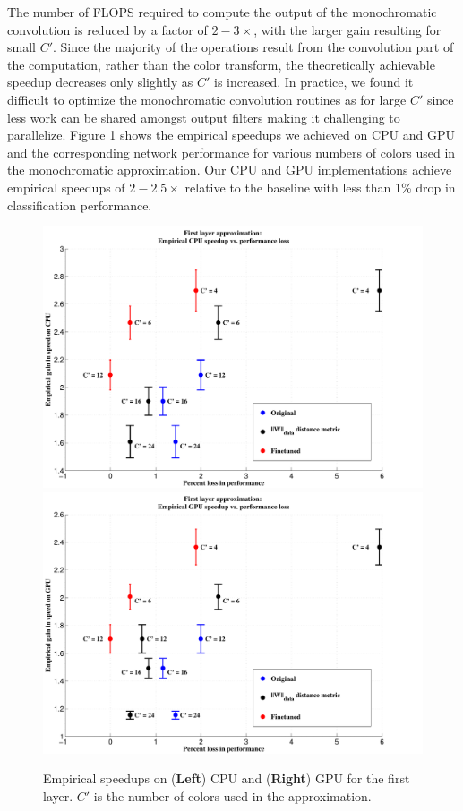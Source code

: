 The number of FLOPS required to compute the output of the monochromatic convolution is reduced by a factor of $2-3\times$, with the larger gain resulting for small $C'$. 
Since the majority of the operations result from the convolution part of the computation, rather than the color transform,
the theoretically achievable speedup decreases only slightly as $C'$ is increased.
In practice, we found it difficult to optimize the monochromatic convolution routines as for large $C'$ since less work can be shared amongst output filters making it challenging to parallelize.
Figure \ref{fig:mono_speedups} shows the empirical speedups we achieved on CPU and GPU and the corresponding network performance for various numbers of colors used in the monochromatic approximation.   
Our CPU and GPU implementations achieve empirical speedups of $2-2.5\times$ relative to the baseline with less than 1\% drop in classification performance. 

\begin{figure}[t]
\centering
\begin{minipage}{0.9\textwidth}
      \includegraphics[width=0.5\linewidth]{img/layer1_CPUspeedup_vs_performance_loss_finetune_and_orig.pdf}
	\quad\quad
      \includegraphics[width=0.5\linewidth]{img/layer1_GPUspeedup_vs_performance_loss_finetune_and_orig.pdf}
\end{minipage}
\caption{Empirical speedups on ({\bf Left}) CPU and ({\bf Right}) GPU for the first layer. $C'$ is the number of colors used in the approximation.}
\label{fig:mono_speedups}
\end{figure}

